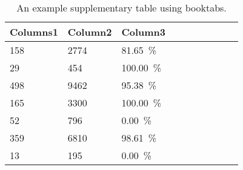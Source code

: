 \begin{table}[ht]
\scriptsize
\centering
\begin{tabular}{@{}llllllllll@{}}
\toprule
Columns1    & Column2        & Column3               \\
\midrule
\num{158}   & \num{2774}     & \SI{81.65}{\percent}  \\
\num{29}    & \num{454}      & \SI{100.00}{\percent} \\
\num{498}   & \num{9462}     & \SI{95.38}{\percent}  \\
\num{165}   & \num{3300}     & \SI{100.00}{\percent} \\
\num{52}    & \num{796}      & \SI{0.00}{\percent}   \\
\num{359}   & \num{6810}     & \SI{98.61}{\percent}  \\
\num{13}    & \num{195}      & \SI{0.00}{\percent}   \\
\bottomrule
\end{tabular}
\caption[Example supplementary table]{
	An example supplementary table using booktabs.
}\label{tab:chapter1:example_table}
\end{table}
